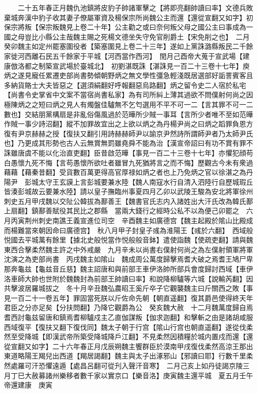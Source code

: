 　　二十五年春正月魏仇池鎮將皮豹子帥諸軍擊之【將即亮翻帥讀曰率】文德兵敗棄城奔漢中豹子收其妻子僚屬軍資及楊保宗所尚魏公主而還【還從宣翻又如字】初保宗將叛【保宗叛魏見上卷二十年】公主勸之或曰奈何叛父母之國公主曰事成為一國之母豈比小縣公主哉魏主賜之死楊文德坐失守免官削爵土【宋免削之也】　二月癸卯魏主如定州罷塞圍役者【築塞圍見上卷二十三年】遂如上黨誅潞縣叛民二千餘家徙河西離石民五千餘家于平城【河西當作西河】　閏月己酉帝大蒐于宣武場【建康倣洛都之制築宣武場於臺城北】　初劉湛既誅【湛誅見一百二十三卷十七年】庾炳之遂見寵任累遷吏部尚書勢傾朝野炳之無文學性彊急輕淺既居選部好詬詈賓客且多納貨賂士大夫皆惡之【選須絹翻好呼報翻惡烏路翻】炳之留令史二人宿於私宅【尚書令史掌省中文案不當宿尚書私家】為有司所糾上薄其過欲不問僕射何尚之因極陳炳之之短曰炳之見人有燭盤佳驢無不乞匄選用不平不可一二【言其罪不可一二數也】交結朋黨構扇是非亂俗傷風過於范曄所少賊一事耳【言所少者唯不至如范曄作賊一事少詩沼翻】縱不加罪故宜出之上欲以炳之為丹楊尹尚之曰炳之蹈罪負恩方復有尹京赫赫之授【復扶又翻引用詩赫赫師尹以諭京尹然詩所謂師尹者乃太師尹氏也】乃更成其形勢也古人云無賞無罰雖堯舜不能為治【漢宣帝詔曰有功不賞有罪不誅雖唐虞不能以化治直吏翻】臣昔啟范曄【事見一百二十三卷十七年】亦懼犯顔苟白愚懷九死不悔【言苟愚懷所欲吐者雖冒九死猶將言之而不悔】歷觀古今未有衆過藉藉【藉秦昔翻】受貨數百萬更得高官厚禄如炳之者也上乃免炳之官以徐湛之為丹陽尹　彭城太守王玄謨上言彭城要兼水陸【魏人南寇水行自清入泗陸行自歷城瑕丘皆湊彭城故云要兼水陸】請以皇子撫臨州事夏四月乙卯以武陵王駿為安北將軍徐州刺史五月甲戌魏以交阯公韓拔為鄯善王【魏書官氏志内入諸姓出大汗氏改為韓氏鄯上扇翻】鎮鄯善賦役其民比之郡縣　當兩大錢行之經時公私不以為便己卯罷之　六月丙寅荆州刺史南譙王義宣進位司空　辛酉魏主如廣德宫【魏主起殿於隂山比殿成而楊難當來朝因命曰廣德宫】　秋八月甲子封皇子彧為淮陽王【彧於六翻】　西域般悦國去平城萬有餘里【據北史般悦當作悦般般音鉢】遣使詣魏【使疏吏翻】請與魏東西合擊柔然魏主許之中外戒嚴　九月辛未以尚書右僕射何尚之為左僕射領軍將軍沈演之為吏部尚書　丙戌魏主如隂山　魏成周公萬度歸擊焉耆大破之焉耆王鳩尸卑那奔龜兹【龜兹音丘慈】魏主詔唐和與前部王車伊洛帥所部兵會度歸討西域【車伊洛車師大帥也世附於魏魏封為前部王帥讀曰率】和說降柳驢等六城【說輸芮翻】因共擊波居羅城拔之　冬十月辛丑魏弘農昭王奚斤卒子它觀襲魏主曰斤關西之敗【事見一百二十一卷五年】罪固當死朕以斤佐命先朝【朝直遥翻】復其爵邑使得終天年君臣之分亦足矣【分扶問翻】乃降它觀爵為公　癸亥魏大赦　十二月魏萬度歸自焉耆西討龜兹留唐和鎮焉耆柳驢戍主乙直伽謀叛【伽求迦翻】和擊斬之由是諸胡咸服西域復平【復扶又翻下復伐同】魏太子朝于行宫【隂山行宫也朝直遥翻】遂從伐柔然至受降城【即漢武帝所築受降城降戶江翻】不見柔然因積糧於城内置戍而還【還從宣翻又如字】二十六年春正月戊辰朔魏主饗群臣於漠南甲戌復伐柔然高涼王那出東道略陽王羯兒出西道【羯居謁翻】魏主與太子出涿邪山【邪讀曰耶】行數千里柔然處羅可汗恐懼遠遁【處昌呂翻可從刋入聲汗音寒】　二月己亥上如丹徒謁京陵三月丁巳大赦募諸州樂移者數千家以實京口【樂音洛】庚寅魏主還平城　夏五月壬午帝還建康　庚寅

